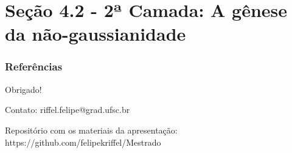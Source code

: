 \documentclass{beamer}
\begin{document}
\section{Seção 4.2 - 2ª Camada: A gênese da não-gaussianidade}
\begin{frame}
\tableofcontents[currentsection]
\end{frame}


\begin{frame}
\frametitle{Referências}
\vspace{-2em}
\scriptsize

    
\end{frame}

\begin{frame}

\begin{center}
\Large Obrigado!
\end{center}

\vspace{1em}
Contato: riffel.felipe@grad.ufsc.br 

\vspace{1em}

Repositório com os materiais da apresentação: https://github.com/felipekriffel/Mestrado
    
\end{frame}
\end{document}
